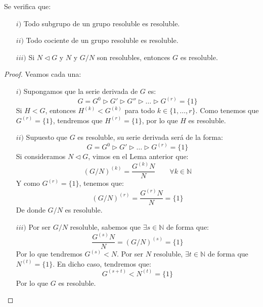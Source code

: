 \begin{prop}
    Se verifica que:
    \begin{enumerate}
        \item[$i)$] Todo subgrupo de un grupo resoluble es resoluble.
        \item[$ii)$] Todo cociente de un grupo resoluble es resoluble.
        \item[$iii)$] Si $N\lhd G$ y $N$ y $G/N$ son resolubles, entonces $G$ es resoluble.
    \end{enumerate}
    \begin{proof}
        Veamos cada una:
        \begin{enumerate}
            \item[$i)$] Supongamos que la serie derivada de $G$ es:
                \begin{equation*}
                    G = G^0 \rhd G' \rhd G '' \rhd \ldots \rhd G^{(r)} = \{1\}
                \end{equation*}
                Si $H<G$, entonces $H^{(k)} < G^{(k)}$ para todo $k \in \{1,\ldots,r\}$. Como tenemos que $G^{(r)} = \{1\}$, tendremos que $H^{(r)} = \{1\}$, por lo que $H$ es resoluble.
            \item[$ii)$] Supuesto que $G$ es resoluble, su serie derivada será de la forma:
                \begin{equation*}
                    G = G^0 \rhd G' \rhd  \ldots \rhd G^{(r)} = \{1\}
                \end{equation*}
                Si consideramos $N\lhd G$, vimos en el Lema anterior que:
                \begin{equation*}
                    {(G/N)}^{(k)} = \dfrac{G^{(k)}N}{N} \qquad \forall k\in \mathbb{N}
                \end{equation*}
                Y como $G^{(r)} = \{1\}$, tenemos que:
                \begin{equation*}
                    {(G/N)}^{(r)} = \dfrac{G^{(r)}N}{N} = \{1\}
                \end{equation*}
                De donde $G/N$ es resoluble.
            \item[$iii)$] Por ser $G/N$ resoluble, sabemos que $\exists s\in \mathbb{N}$ de forma que:
                \begin{equation*}
                    \dfrac{G^{(s)}N}{N} = {(G/N)}^{(s)} = \{1\}
                \end{equation*}
                Por lo que tendremos $G^{(s)} < N$. Por ser $N$ resoluble, $\exists t\in \mathbb{N}$ de forma que $N^{(t)} =\{1\}$. En dicho caso, tendremos que:
                \begin{equation*}
                    G^{(s+t)} < N^{(t)} = \{1\}
                \end{equation*}
                Por lo que $G$ es resoluble.\qedhere
        \end{enumerate}
    \end{proof}
\end{prop}

